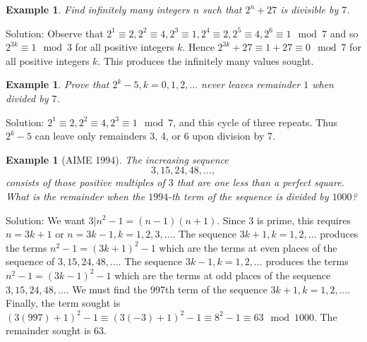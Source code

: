 \documentclass[11pt, openany]{book}
\theoremstyle{change} \theoremheaderfont{\blue\sffamily\bfseries}
\newtheorem{exa}[thm]{Example}
\theoremstyle{nonumberplain} \theoremheaderfont{\sffamily\bfseries}
\newcommand{\í}{\'{\i}}
\begin{document}
\begin{exa} Find infinitely many integers $n$ such that
$2^n + 27$ is divisible by $7$.\end{exa} Solution: Observe that
$2^1 \equiv 2, 2^2 \equiv 4, 2^3 \equiv 1, 2^4 \equiv 2, 2^5
\equiv 4, 2^6 \equiv 1 \mod 7$ and so $2^{3k} \equiv 1 \mod 3$ for
all positive integers $k$. Hence $2^{3k} + 27 \equiv 1 + 27 \equiv
0 \mod 7$ for all positive integers $k$. This produces the
infinitely many values sought.
\begin{exa} Prove that $2^k - 5, k = 0, 1, 2, \ldots$ never leaves remainder
$1$ when divided by $7$.\end{exa} Solution: $2^1 \equiv 2, 2^2
\equiv 4, 2^3 \equiv 1 \mod 7$, and this cycle of three repeats.
Thus $2^k - 5$ can leave only remainders 3, 4, or 6 upon division
by 7.
\begin{exa}[AIME 1994] The increasing sequence $$3, 15, 24, 48, \ldots ,$$ consists of those positive multiples
of $3$ that are one less than a perfect square. What is the
remainder when the $1994$-th term of the sequence is divided by
$1000$? \end{exa} Solution: We want $3|n^2 - 1 = (n - 1)(n + 1)$.
Since 3 is prime, this requires $n = 3k + 1$ or $n = 3k - 1, k =
1, 2, 3, \ldots $. The sequence $3k + 1, k = 1, 2, \ldots$
produces the terms $n^2 - 1 = (3k + 1)^2 - 1$ which are the terms
at even places of the sequence of $3, 15, 24, 48, \ldots $. The
sequence $3k - 1, k = 1, 2, \ldots$ produces the terms $n^2 - 1 =
(3k - 1)^2 - 1$ which are the terms at odd places of the sequence
$3, 15, 24, 48, \ldots $. We must find the 997th term of the
sequence $3k + 1, k = 1, 2, \ldots$. Finally, the term sought is
$(3(997) + 1)^2 - 1 \equiv (3(-3) + 1)^2 - 1 \equiv 8^2 - 1 \equiv
63 \mod 1000.$ The remainder sought is 63.
\end{document}
